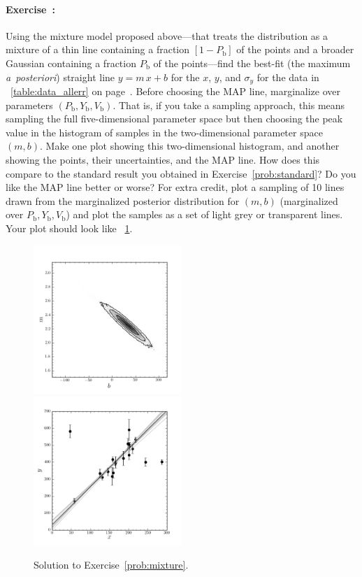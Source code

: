\documentclass[12pt,twoside]{article}
\newcommand{\notenglish}[1]{\textsl{#1}}
\newcommand{\aposteriori}{\notenglish{a~posteriori}}
\newcommand{\problemname}{Exercise}
\newcounter{problem}
\newenvironment{problem}{\paragraph{\problemname~\theproblem:}\refstepcounter{problem}}{}
\newcommand{\Pbad}{P_{\mathrm{b}}}
\newcommand{\Ybad}{Y_{\mathrm{b}}}
\newcommand{\Vbad}{V_{\mathrm{b}}}
\begin{document}
\begin{problem}\label{prob:mixture}
Using the mixture model proposed above---that treats the distribution
as a mixture of a thin line containing a fraction $[1-\Pbad]$ of the
points and a broader Gaussian containing a fraction $\Pbad$ of the
points---find the best-fit (the maximum \aposteriori) straight line
$y=m\,x+b$ for the $x$, $y$, and $\sigma_y$ for the data in
\tablename~\ref{table:data_allerr} on
page~\pageref{table:data_allerr}.  Before choosing the MAP line,
marginalize over parameters $(\Pbad,\Ybad,\Vbad)$.  That is, if you
take a sampling approach, this means sampling the full
five-dimensional parameter space but then choosing the peak value in
the histogram of samples in the two-dimensional parameter space
$(m,b)$.  Make one plot showing this two-dimensional histogram, and
another showing the points, their uncertainties, and the MAP line.
How does this compare to the standard result you obtained in
\problemname~\ref{prob:standard}?  Do you like the MAP line better or
worse?  For extra credit, plot a sampling of 10 lines drawn from the
marginalized posterior distribution for $(m,b)$ (marginalized over
$\Pbad,\Ybad,\Vbad$) and plot the samples as a set of light grey or
transparent lines.  Your plot should look like
\figurename~\ref{fig:mixture}.
\end{problem}

\begin{figure}[htbp]
\includegraphics[width=0.5\textwidth]{exMix1a.png}
\includegraphics[width=0.5\textwidth]{exMix1b.png}
\caption{Solution to \problemname~\ref{prob:mixture}.}\label{fig:mixture}
\end{figure}
\end{document}
